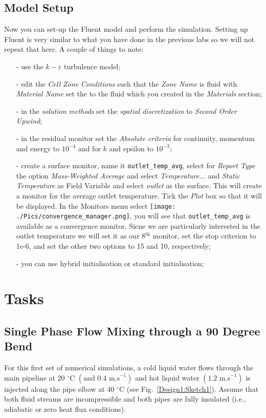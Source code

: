 \documentclass[12pts,a4paper,amsmath,amssymb,floatfix]{article}%
\begin{document}
\subsection{Model Setup}
Now you can set-up the Fluent model and perform the simulation. Setting up Fluent is very similar to what you have done in the previous labs so we will not repeat that here. A couple of things to note:
\begin{itemize}
\item[-] use the $k-\varepsilon$ turbulence model;
\item[-] edit the \emph{Cell Zone Conditions} such that the \emph{Zone Name} is fluid with \emph{Material Name} set the to the fluid which you created in the \emph{Materials} section;
\item[-] in the \emph{solution methods} set the \emph{spatial discretization} to \emph{Second Order Upwind};
\item[-] in the residual monitor set the \emph{Absolute criteria} for continuity, momentum and energy to $10^{-4}$ and for $k$ and epsilon to $10^{-3}$;
\item[-] create a surface monitor, name  it \texttt{outlet\_temp\_avg}, select for \emph{Report Type} the option \emph{Mass-Weighted Average} and select \emph{Temperature...} and \emph{Static Temperature} as Field Variable and select \emph{outlet} as the surface. This will create a monitor for the average outlet temperature. Tick the \emph{Plot} box so that it will be displayed. In the Monitors menu select \texttt{[image: ./Pics/convergence\_manager.png]}, you will see that \texttt{outlet\_temp\_avg} is available as a convergence monitor. Sicne we are particularly interested in the outlet temperature we will set it as our 8$^\mathrm{th}$ monitor, set the stop criterion to 1e-6, and set the other two options to 15 and 10, respectively;
\item[-] you can use hybrid initialisation or standard initialisation;
\end{itemize}



\section{Tasks}
\subsection{Single Phase Flow Mixing through a 90 Degree Bend}\label{Task:Section1}
 For this first set of numerical simulations, a cold liquid water flows through the main pipeline at 20 $^{\circ}$C $\left(\text{and 0.4 m.s}^{-1}\right)$ and hot liquid water $\left(\text{1.2 m.s}^{-1}\right)$ is injected along the pipe elbow at 40 $^{\circ}$C (see Fig.~\ref{Design1:Sketch1}). Assume that both fluid streams are incompressible and both pipes are fully insulated (i.e., adiabatic or zero heat flux conditions).
    
\end{document}

